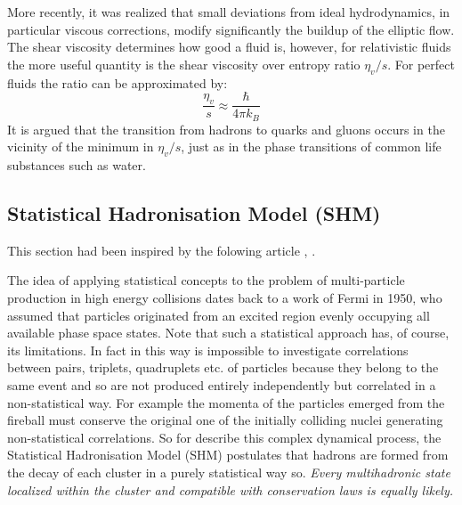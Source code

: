\documentclass[12pt,a4paper]{book}
\begin{document}
	More recently, it was realized that small deviations from ideal hydrodynamics, in particular viscous corrections, modify significantly the buildup of the elliptic flow. The shear viscosity determines how good a fluid is, however, for relativistic fluids the more useful quantity is the shear viscosity over entropy ratio $\eta_v/s$. For perfect fluids the ratio can be approximated by:
	\begin{equation}
		\frac{\eta_v}{s} \approx \frac{\hbar}{4\pi k_B}
	\end{equation}
	It is argued that the transition from hadrons to quarks and gluons occurs in the vicinity of the minimum in $\eta_v/s$, just as in the phase transitions of common life substances such as water.
	
	
	\subsection{Statistical Hadronisation Model (SHM)}
	This section had been inspired by the folowing article \cite{becattini2009introductionstatisticalhadronizationmodel}, \cite{charm_hierarchy_in_the_statistical_hadronization_model} \cite{heinz2004conceptsheavyionphysics} \cite{amsdottorato9036}.
	
	The idea of applying statistical concepts to the problem of multi-particle production in high energy collisions dates back to a work of Fermi in 1950, who assumed that particles originated from an excited region evenly occupying all available phase space states. Note that such a statistical approach has, of course, its limitations. In fact in this way is impossible to investigate correlations between pairs, triplets, quadruplets etc. of particles because they belong to the same event and so are not produced entirely independently but correlated in a non-statistical way. For example the momenta of the particles emerged from the fireball must conserve the original one of the initially colliding nuclei generating non-statistical correlations. So for describe this complex dynamical process, the Statistical Hadronisation Model (SHM) postulates that hadrons are formed from the decay of each cluster in a purely statistical way so. \textit{Every multihadronic state localized within the cluster and compatible with conservation laws is equally likely.}
	
\end{document}
